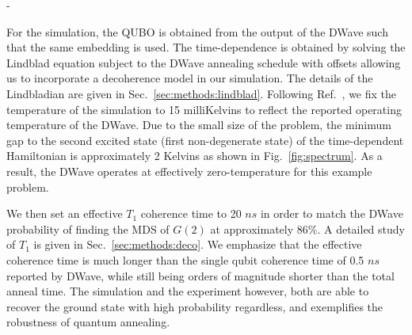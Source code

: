 -\documentclass[prd,twocolumn,tightenlines,preprintnumbers,showpacs,superscriptaddress,notitlepage,nofootinbib,eqsecnum,floatfix,longbibliography]{revtex4}
\begin{document}
For the simulation, the QUBO is obtained from the output of the DWave such that the same embedding is used.
The time-dependence is obtained by solving the Lindblad equation subject to the DWave annealing schedule with offsets allowing us to incorporate a decoherence model in our simulation.
The details of the Lindbladian are given in Sec.~\ref{sec:methods:lindblad}.
Following Ref.~\cite{}, we fix the temperature of the simulation to 15 milliKelvins to reflect the reported operating temperature of the DWave.
Due to the small size of the problem, the minimum gap to the second excited state (first non-degenerate state) of the time-dependent Hamiltonian is approximately 2 Kelvins as shown in Fig.~\ref{fig:spectrum}.
As a result, the DWave operates at effectively zero-temperature for this example problem.

We then set an effective $T_1$ coherence time to 20 $ns$ in order to match the DWave probability of finding the MDS of $G(2)$ at approximately 86\%.
A detailed study of $T_1$ is given in Sec.~\ref{sec:methods:deco}.
We emphasize that the effective coherence time is much longer than the single qubit coherence time of 0.5 $ns$ reported by DWave, while still being orders of magnitude shorter than the total anneal time.
The simulation and the experiment however, both are able to recover the ground state with high probability regardless, and exemplifies the robustness of quantum annealing.
\end{document}

